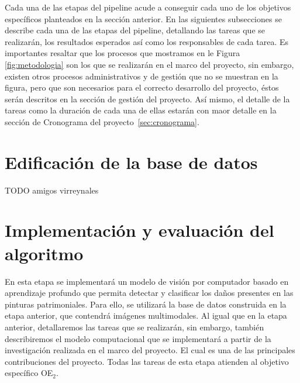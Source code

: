Cada una de las etapas del pipeline acude a conseguir cada uno de los objetivos específicos planteados en la sección anterior. 
En las siguientes subsecciones se describe cada una de las etapas del pipeline, detallando las tareas que se realizarán, 
los resultados esperados así como los responsables de cada tarea. Es importantes resaltar que los procesos que mostramos
en le Figura \ref{fig:metodologia} son los que se realizarán en el marco del proyecto, sin embargo, existen otros procesos 
administrativos y de gestión que no se muestran en la figura, pero que son necesarios para el correcto desarrollo del proyecto, 
éstos serán descritos en la sección de gestión del proyecto. Así mismo, el detalle de la tareas como la duración de cada una de ellas
estarán con maor detalle en la sección de Cronograma del proyecto~\ref{sec:cronograma}. 

\section{Edificación de la base de datos}

TODO amigos virreynales


\section{Implementación y evaluación del algoritmo}
En esta etapa se implementará un modelo de visión por computador basado en aprendizaje profundo que permita detectar y 
clasificar los daños presentes en las pinturas patrimoniales. Para ello, se utilizará la base de datos construida en la etapa anterior, 
que contendrá imágenes multimodales. Al igual que en la etapa anterior, detallaremos las tareas que se realizarán, sin embargo, 
también describiremos el modelo computacional que se implementará a partir de la investigación realizada en el marco del proyecto. 
El cual es una de las principales contribuciones del proyecto. Todas las tareas de esta etapa atienden al objetivo específico OE$_2$. 


